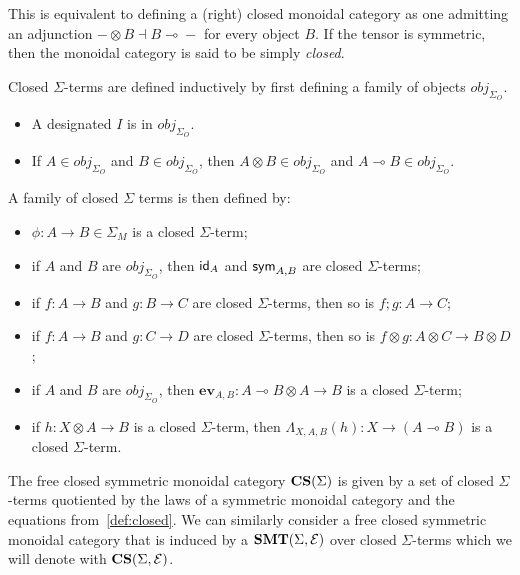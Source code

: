This is equivalent to defining a (right) closed monoidal category as one admitting an adjunction $- \otimes B \dashv B \multimap{} -$ for every object $B$.
If the tensor is symmetric, then the monoidal category is said to be simply \emph{closed}.

\begin{definition}
	Closed $\Sigma$-terms are defined inductively by first defining a family of objects $obj_{\Sigma_{O}}$.
	\begin{itemize}
		\item A designated $I$ is in $obj_{\Sigma_{O}}$.
		\item If $A \in obj_{\Sigma_{O}}$ and $B \in obj_{\Sigma_{O}}$, then $A \otimes B \in obj_{\Sigma_{O}}$ and $A \multimap B \in obj_{\Sigma_{O}}$.
	\end{itemize}
	A family of closed $\Sigma$ terms is then defined by:
	\begin{itemize}
		\item $\phi : A \to B \in \Sigma_{M}$ is a closed $\Sigma$-term;
		\item if $A$ and $B$ are $obj_{\Sigma_{O}}$, then $\textsf{id}_{A}$ and $\textsf{sym}_{A,B}$ are closed $\Sigma$-terms;
		\item if $f : A \to B$ and $g : B \to C$ are closed $\Sigma$-terms, then so is $f;g : A \to C$;
		\item if $f : A \to B$ and $g : C \to D$ are closed $\Sigma$-terms, then so is $f \otimes g : A \otimes C \to B \otimes D$;
		\item if $A$ and $B$ are $obj_{\Sigma_{O}}$, then $\textbf{ev}_{A,B} : A \multimap B \otimes A \to B$ is a closed $\Sigma$-term;
		\item if $h : X \otimes A \to B$ is a closed $\Sigma$-term, then $\Lambda_{X,A,B}(h) : X \to (A \multimap B)$ is a closed $\Sigma$-term.
	\end{itemize}
\end{definition}

\begin{definition}
	The free closed symmetric monoidal category $\mathbf{CS}(\Sigma)$ is given by a set of closed $\Sigma$-terms quotiented by the laws of a symmetric monoidal category and the equations from~\autoref{def:closed}.
	We can similarly consider a free closed symmetric monoidal category that is induced by a $\mathbf{SMT}(\Sigma, \mathcal{E})$ over closed $\Sigma$-terms which we will denote with $\mathbf{CS}(\Sigma, \mathcal{E})$.
\end{definition}

